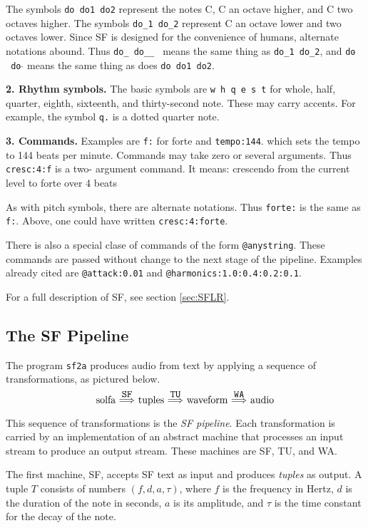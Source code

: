 \documentclass[11pt]{amsart}
\newcommand{\mcaret}{$\hat{}$}
\newcommand{\mmcaret}{$\hat{}\;\hat{}$}
\newcommand{\mapright}[1]{\ \smash{ 
   \mathop{\Longrightarrow}\limits^{#1}}\ }
\newcommand{\strong}[1]{{\bf #1}}
\begin{document}
The symbols {\tt do do1 do2} represent the 
notes C, C an octave higher, and C two octaves higher.  The symbols {\tt do\_1 do\_2}
represent C an octave lower and two octaves lower.  Since SF is designed for the 
convenience of humans, alternate notations abound.  Thus {\tt do\_ do\_\_ } means
the same thing as {\tt do\_1 do\_2}, and {\tt do\mcaret\ do{\mmcaret}} means the same thing
as does {\tt do do1 do2}.

\strong{2. Rhythm symbols.}  The basic symbols are {\tt w h q e s t} for whole, half, quarter, eighth,
sixteenth, and thirty-second note.  These may carry accents.  For example, the symbol {\tt q.} is a dotted 
quarter note.

\strong{3. Commands.} Examples are {\tt f:} for forte and {\tt tempo:144}. 
which sets the tempo to 144
beats per minute.  Commands may take zero or several arguments.  Thus {\tt cresc:4:f} is a two-
argument
command.  It means: crescendo from the current level to forte over 4 beats

As with pitch symbols, there are alternate notations.  Thus {\tt forte:} is the same as 
{\tt f:}. Above, one could have written {\tt cresc:4:forte}. 

There is also a special clase of commands of the form {\tt @anystring}.  These commands are passed without
change to the next stage of the pipeline.  Examples already cited are {\tt @attack:0.01} and 
{\tt @harmonics:1.0:0.4:0.2:0.1}.

For a full description of SF, see section \ref{sec:SFLR}.





\subsection{The SF Pipeline}

The program {\tt sf2a} produces audio from text by applying a sequence of transformations, as pictured below. 

\[
  \hbox{solfa} 
  \mapright{\hbox{\tt SF}}
  \hbox{tuples}
  \mapright{\hbox{\tt TU}}
  \hbox{waveform}
  \mapright{\hbox{\tt WA}}
  \hbox{audio}
\]

This sequence of transformations is the \emph{SF pipeline}.  
Each transformation is carried by an implementation of
an abstract machine that processes an input stream to produce an output
stream.  These machines are SF, TU, and WA.  

The first machine, SF, accepts
SF text as input and produces \emph{tuples} as output.
A tuple $T$ consists of numbers $(f,d, a, \tau)$,
where $f$ is the frequency in Hertz, $d$ is the duration of the note in seconds,
$a$ is its amplitude, and $\tau$ is the time constant for the decay of the note.
\end{document}
